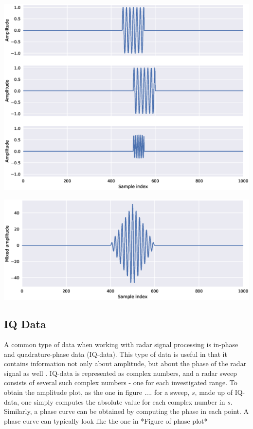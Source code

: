 \includegraphics[scale=0.5]{figs_temp/mixing1}

\includegraphics[scale=0.5]{figs_temp/mixing2}




\subsection{IQ Data}
A common type of data when working with radar signal processing is in-phase and quadrature-phase data (IQ-data).  This type of data is useful in that it contains information not only about amplitude, but about the phase of the radar signal as well \citep{richards_2014}. IQ-data is represented as complex numbers, and a radar sweep consists of several such complex numbers - one for each investigated range. To obtain the amplitude plot, as the one in figure .... for a sweep, $s$, made up of IQ-data, one simply computes the absolute value for each complex number in $s$. Similarly, a phase curve can be obtained by computing the phase in each point. A phase curve can typically look like the one in *Figure of phase plot*

